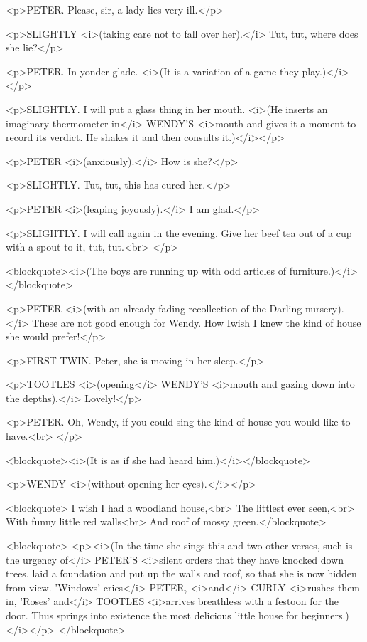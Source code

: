 <p>PETER. Please, sir, a lady lies very ill.</p>

<p>SLIGHTLY <i>(taking care not to fall over her).</i> Tut, tut,
where does she lie?</p>

<p>PETER. In yonder glade. <i>(It is a variation of a game they
play.)</i></p>

<p>SLIGHTLY. I will put a glass thing in her mouth. <i>(He inserts an
imaginary thermometer in</i> WENDY'S <i>mouth and gives it a moment
to record its verdict. He shakes it and then consults it.)</i></p>

<p>PETER <i>(anxiously).</i> How is she?</p>

<p>SLIGHTLY. Tut, tut, this has cured her.</p>

<p>PETER <i>(leaping joyously).</i> I am glad.</p>

<p>SLIGHTLY. I will call again in the evening. Give her beef tea out
of a cup with a spout to it, tut, tut.<br>
</p>

<blockquote><i>(The boys are running up with odd articles of
furniture.)</i></blockquote>

<p>PETER <i>(with an already fading recollection of the Darling
nursery).</i> These are not good enough for Wendy. How Iwish I knew
the kind of house she would prefer!</p>

<p>FIRST TWIN. Peter, she is moving in her sleep.</p>

<p>TOOTLES <i>(opening</i> WENDY'S <i>mouth and gazing down into the
depths).</i> Lovely!</p>

<p>PETER. Oh, Wendy, if you could sing the kind of house you would
like to have.<br>
</p>

<blockquote><i>(It is as if she had heard him.)</i></blockquote>

<p>WENDY <i>(without opening her eyes).</i></p>

<blockquote>  I wish I had a woodland house,<br>
  The littlest ever seen,<br>
  With funny little red walls<br>
  And roof of mossy green.</blockquote>

<blockquote>
<p><i>(In the time she sings this and two other verses, such is the
urgency of</i> PETER'S <i>silent orders that they have knocked down
trees, laid a foundation and put up the walls and roof, so that she
is now hidden from view. 'Windows' cries</i> PETER, <i>and</i> CURLY
<i>rushes them in, 'Roses' and</i> TOOTLES <i>arrives breathless with
a festoon for the door. Thus springs into existence the most
delicious little house for beginners.)</i></p>
</blockquote>

